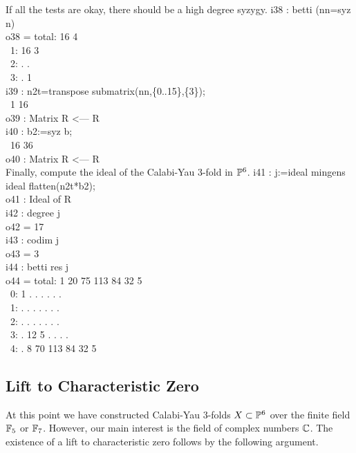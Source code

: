 \begin{example}
If all the tests are okay, there should be a high degree syzygy.
\beginOutput
i38 : betti (nn=syz n)\\
\emptyLine
o38 = total: 16 4\\
\          1: 16 3\\
\          2:  . .\\
\          3:  . 1\\
\endOutput
\beginOutput
i39 : n2t=transpose submatrix(nn,\{0..15\},\{3\});\\
\emptyLine
\              1       16\\
o39 : Matrix R  <--- R\\
\endOutput
\beginOutput
i40 : b2:=syz b;\\
\emptyLine
\              16       36\\
o40 : Matrix R   <--- R\\
\endOutput
Finally, compute the ideal of the Calabi-Yau 3-fold in ${\mathbb P}^6$.
\beginOutput
i41 : j:=ideal mingens ideal flatten(n2t*b2);\\
\emptyLine
o41 : Ideal of R\\
\endOutput
\beginOutput
i42 : degree j\\
\emptyLine
o42 = 17\\
\endOutput
\beginOutput
i43 : codim j\\
\emptyLine
o43 = 3\\
\endOutput
\beginOutput
i44 : betti res j\\
\emptyLine
o44 = total: 1 20 75 113 84 32 5\\
\          0: 1  .  .   .  .  . .\\
\          1: .  .  .   .  .  . .\\
\          2: .  .  .   .  .  . .\\
\          3: . 12  5   .  .  . .\\
\          4: .  8 70 113 84 32 5\\
\endOutput
\end{example}




\subsection{Lift to Characteristic Zero}

At this point we have constructed Calabi-Yau 3-folds $X \subset {\mathbb P}^6$ over
the finite field ${\mathbb F}_5$ or ${\mathbb F}_7$. 
However, our main interest is the field of complex numbers ${\mathbb C}$. 
The existence of a lift to characteristic zero follows by the following argument.

